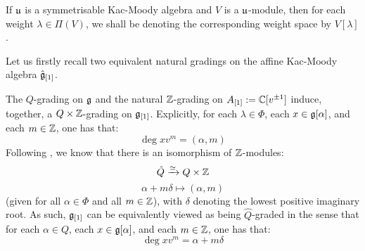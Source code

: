        \newpage
        
        \begin{convention}
            If $\mathfrak{u}$ is a symmetrisable Kac-Moody algebra and $V$ is a $\mathfrak{u}$-module, then for each weight $\lambda \in \Pi(V)$, we shall be denoting the corresponding weight space by $V[\lambda]$.
        \end{convention}

        Let us firstly recall two equivalent natural gradings on the affine Kac-Moody algebra $\hat{\mathfrak{g}}_{[1]}$. 
        \begin{remark}
            The $Q$-grading on $\mathfrak{g}$ and the natural $\mathbb{Z}$-grading on $A_{[1]} := \mathbb{C}[v^{\pm 1}]$ induce, together, a $Q \x \Z$-grading on $\mathfrak{g}_{[1]}$. Explicitly, for each $\lambda \in \Phi$, each $x \in \mathfrak{g}[\alpha]$, and each $m \in \mathbb{Z}$, one has that:
                $$\deg x v^m = (\alpha, m)$$
            Following \cite[Chapter 6]{kac_infinite_dimensional_lie_algebras}, we know that there is an isomorphism of $\mathbb{Z}$-modules:
                $$\hat{Q} \xrightarrow[]{\cong} Q \x \Z$$
                $$\alpha + m \delta \mapsto (\alpha, m)$$
            (given for all $\alpha \in \Phi$ and all $m \in \mathbb{Z}$), with $\delta$ denoting the lowest positive imaginary root. As such, $\mathfrak{g}_{[1]}$ can be equivalently viewed as being $\hat{Q}$-graded in the sense that for each $\alpha \in Q$, each $x \in \mathfrak{g}[\alpha]$, and each $m \in \mathbb{Z}$, one has that:
                $$\deg x v^m = \alpha + m \delta$$
        \end{remark}
